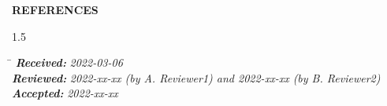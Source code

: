 \documentclass[12pt,a4paper,oneside]{article}
\def \newsection{\vspace{12pt}\textbf}
\newcommand{\RECEIVED}{2022-03-06}
\newcommand{\REVIEWEDfirst}{2022-xx-xx }
\newcommand{\REVIEWERfirst}{A. Reviewer1}
\newcommand{\REVIEWEDsecond}{2022-xx-xx }
\newcommand{\REVIEWERsecond}{B. Reviewer2}
\newcommand{\ACCEPTED}{2022-xx-xx }
\begin{document}

\newsection {REFERENCES}





\vspace{30pt}

\begin{spacing}{1.5}
\begin{tabbing}
\hspace{2.2cm} \= \kill
\textit{\textbf{Received:}} \> \textit{\RECEIVED} \\
\textit{\textbf{Reviewed:}} \> \textit{\REVIEWEDfirst (by \REVIEWERfirst) and \REVIEWEDsecond (by \REVIEWERsecond)}\\
\textit{\textbf{Accepted:}} \> \textit{\ACCEPTED} \\
\end{tabbing}
\end{spacing}

\end{document}

